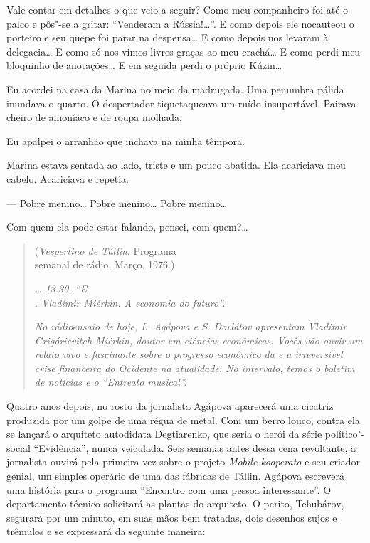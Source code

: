 Vale contar em detalhes o que veio a seguir? Como meu companheiro foi
até o palco e pôs"-se a gritar: ``Venderam a Rússia!\ldots{}''. E como depois
ele nocauteou o porteiro e seu quepe foi parar na despensa\ldots{} E como
depois nos levaram à delegacia\ldots{} E como só nos vimos livres graças ao
meu crachá\ldots{} E como perdi meu bloquinho de anotações\ldots{} E em seguida
perdi o próprio Kúzin\ldots{}

Eu acordei na casa da Marina no meio da madrugada. Uma penumbra pálida
inundava o quarto. O despertador tiquetaqueava um ruído insuportável.
Pairava cheiro de amoníaco e de roupa molhada.

Eu apalpei o arranhão que inchava na minha têmpora.

Marina estava sentada ao lado, triste e um pouco abatida. Ela acariciava
meu cabelo. Acariciava e repetia:

--- Pobre menino\ldots{} Pobre menino\ldots{} Pobre menino\ldots{}

Com quem ela pode estar falando, pensei, com quem?\ldots{}

\clearpage
\thispagestyle{empty}

\movetooddpage
\begin{center}
{}
\end{center}

\begin{quotation}
\begin{flushright}
(\emph{Vespertino de Tállin}. Programa\\semanal de rádio. Março. 1976.)
\end{flushright}
\vspace{4pt}
\hspace{-10pt}\emph{\ldots{} 13.30. ``E
\\. Vladímir
Miérkin. A economia do futuro''.}

\emph{No rádioensaio de hoje, L. Agápova e S. Dovlátov apresentam
Vladímir Grigórievitch Miérkin, doutor em ciências econômicas. Vocês vão
ouvir um relato vivo e fascinante sobre o progresso econômico da  e
a irreversível crise financeira do Ocidente na atualidade. No intervalo,
temos o boletim de notícias e o ``Entreato musical''.}
\end{quotation}

Quatro anos depois, no rosto da jornalista Agápova aparecerá uma
cicatriz produzida por um golpe de uma régua  de metal. Com um berro
louco, contra ela se lançará o arquiteto autodidata Degtiarenko, que
seria o herói da série político"-social ``Evidência'', nunca
veiculada. Seis semanas antes dessa cena revoltante, a jornalista ouvirá
pela primeira vez sobre o projeto \emph{Mobile kooperato} e seu criador
genial, um simples operário de uma das fábricas de Tállin. Agápova
escreverá uma história para o programa ``Encontro com uma pessoa
interessante''. O departamento técnico solicitará as plantas do
arquiteto. O perito, Tchubárov, segurará por um minuto, em suas mãos bem
tratadas, dois desenhos sujos e trêmulos e se expressará da seguinte
maneira:

